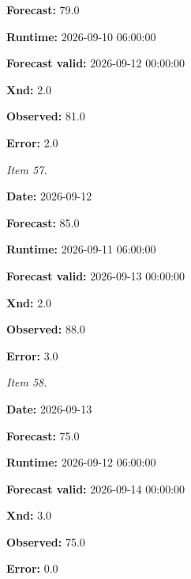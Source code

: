 \documentclass[11pt]{article}
\begin{document}
\par\noindent\textbf{Forecast:} 79.0

\par\noindent\textbf{Runtime:} 2026-09-10 06:00:00

\par\noindent\textbf{Forecast valid:} 2026-09-12 00:00:00

\par\noindent\textbf{Xnd:} 2.0

\par\noindent\textbf{Observed:} 81.0

\par\noindent\textbf{Error:} 2.0

\par\noindent\textit{Item 57.}\par \par\noindent\textbf{Date:} 2026-09-12

\par\noindent\textbf{Forecast:} 85.0

\par\noindent\textbf{Runtime:} 2026-09-11 06:00:00

\par\noindent\textbf{Forecast valid:} 2026-09-13 00:00:00

\par\noindent\textbf{Xnd:} 2.0

\par\noindent\textbf{Observed:} 88.0

\par\noindent\textbf{Error:} 3.0

\par\noindent\textit{Item 58.}\par \par\noindent\textbf{Date:} 2026-09-13

\par\noindent\textbf{Forecast:} 75.0

\par\noindent\textbf{Runtime:} 2026-09-12 06:00:00

\par\noindent\textbf{Forecast valid:} 2026-09-14 00:00:00

\par\noindent\textbf{Xnd:} 3.0

\par\noindent\textbf{Observed:} 75.0

\par\noindent\textbf{Error:} 0.0
\end{document}
